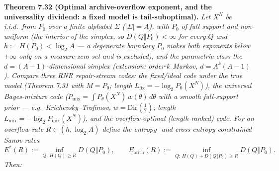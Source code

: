 \documentclass[
]{article}
\begin{document}
\textbf{Theorem 7.32 (Optimal archive-overflow exponent, and the universality
dividend: a fixed model is tail-suboptimal).} \emph{Let $X^N$ be i.i.d.\ from
$P_0$ over a finite alphabet $\Sigma$ ($|\Sigma|=A$), with $P_0$ of \emph{full
support and non-uniform} (the interior of the simplex, so $D(Q\Vert P_0)<\infty$ for
every $Q$ and $h:=H(P_0)<\log_2 A$ --- a degenerate boundary $P_0$ makes both
exponents below $+\infty$ only on a measure-zero set and is excluded), and the
parametric class the $d=(A{-}1)$-dimensional simplex (extension: order-$k$ Markov,
$d=A^k(A{-}1)$).
Compare three RNR repair-stream codes: the \emph{fixed/ideal} code under the true
model (Theorem 7.31 with $M=P_0$; length $L_{\mathrm{fix}}=-\log_2 P_0(X^N)$), the
\emph{universal} Bayes-mixture code ($P_{\mathrm{mix}}=\int P_\theta(X^N)\,w(\theta)\,
d\theta$ with a smooth full-support prior --- e.g.\ Krichevsky--Trofimov,
$w=\mathrm{Dir}(\tfrac12)$; length $L_{\mathrm{mix}}=-\log_2 P_{\mathrm{mix}}(X^N)$),
and the \emph{overflow-optimal} (length-ranked) code. For an overflow rate
$R\in(h,\log_2 A)$ define the entropy- and cross-entropy-constrained Sanov rates}
\[
  E^\ast(R):=\!\!\inf_{Q:\,H(Q)\ge R}\!\! D(Q\Vert P_0),
  \qquad
  E_{\mathrm{arith}}(R):=\!\!\inf_{Q:\,H(Q)+D(Q\Vert P_0)\ge R}\!\! D(Q\Vert P_0).
\]
\emph{Then:}
\end{document}

